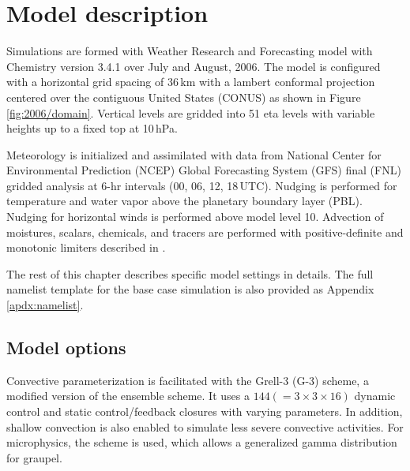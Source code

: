\section{Model description}\label{sec:2006/method}


Simulations are formed with Weather Research and Forecasting model \citep{Skamarock:2008xx} with Chemistry \citep[WRF-Chem;][]{Grell:2005fv} version 3.4.1 over July and August, 2006. The model is configured with a horizontal grid spacing of 36\,\unit{km} with a lambert conformal projection centered over the contiguous United States (CONUS) as shown in Figure \ref{fig:2006/domain}. Vertical levels are gridded into 51 eta levels with variable heights up to a fixed top at 10\,\unit{hPa}.

Meteorology is initialized and assimilated with data from National Center for Environmental Prediction (NCEP) Global Forecasting System (GFS) final (FNL) gridded analysis at 6-hr intervals (00, 06, 12, 18\,\unit{UTC}). Nudging is performed for temperature and water vapor above the planetary boundary layer (PBL). Nudging for horizontal winds is performed above model level 10. Advection of moistures, scalars, chemicals, and tracers are performed with positive-definite and monotonic limiters described in \citet{Skamarock:2006wm}.

The rest of this chapter describes specific model settings in details. The full namelist template for the base case simulation is also provided as Appendix \ref{apdx:namelist}.

\subsection{Model options}\label{ssec:2006/method/settings}

	Convective parameterization is facilitated with the Grell-3 (G-3) scheme, a modified version of the \citet{Grell:2002bs} ensemble scheme. It uses a $144(=3\times3\times16)$ dynamic control and static control/feedback closures with varying parameters. In addition, shallow convection is also enabled to simulate less severe convective activities. For microphysics, the \citet{Thompson:2008vn} scheme is used, which allows a generalized gamma distribution for graupel.

